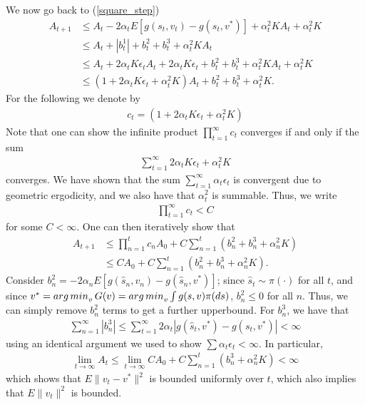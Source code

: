 \documentclass[twoside,11pt]{article}
\def\argmin{\mathop{\rm arg\, min}}
\begin{document}
We now go back to (\ref{square_step}) 
\begin{align*}
A_{t+1}&  \leq  A_t - 2\alpha_t E\left[ g(s_t,v_t) - g(s_t,v^*) \right] + \alpha_t^2 K A_t +  \alpha_t^2 K  \\
& \leq A_t + |b_t^1| + b_t^2 + b_t^3 +\alpha_t^2 K A_t\\
& \leq A_t + 2\alpha_t K \epsilon_t A_t + 2\alpha_t K \epsilon_t + b_t^2 + b_t^3 + \alpha_t^2 K A_t +  \alpha_t^2 K  \\
&\leq (1 + 2\alpha_t K \epsilon_t +   \alpha_t^2 K )A_t + b_t^2 + b_t^3  +  \alpha_t^2 K .
\end{align*}
For the following we denote by 
\begin{align*}
c_t =(1 + 2\alpha_t K \epsilon_t +   \alpha_t^2 K )
\end{align*}
Note that one can show the infinite product $\prod_{t=1}^\infty c_t$ converges if and only if the sum
\begin{align*}
\sum_{t=1}^\infty2\alpha_t K \epsilon_t +   \alpha_t^2 K 
\end{align*}
converges. We have shown that the sum  $\sum_{t=1}^\infty \alpha_t\epsilon_t$ is convergent due to geometric ergodicity, and we also have that $\alpha_t^2$ is summable. Thus, we write
\begin{align*}
\prod_{t=1}^\infty c_t < C
\end{align*}
for some $C<\infty$. One can then iteratively show that 
\begin{align*}
A_{t+1}& \leq \prod_{n=1}^{t} c_n A_0 + C \sum_{n=1}^t \left(b_n^2 + b_n^3   +  \alpha_n^2 K  \right)\\
& \leq C A_0 + C \sum_{n=1}^t \left(b_n^2 + b_n^3 + \alpha_n^2 K    \right).
\end{align*}
Consider $b^2_n=  - 2\alpha_n E\left[ g(\hat{s}_n,v_n) - g(\hat{s}_n,v^*) \right] $; since $\hat{s}_t\sim \pi(\cdot)$ for all $t$, and since $v^*=\argmin_v G(v) = \argmin_v \int g(s,v)\pi(ds)$, $b^2_n\leq 0$ for all $n$.    Thus, we can simply remove $b_n^2$ terms to get a further upperbound. For $b_n^3$, we have that 
\begin{align*}
\sum_{n=1}^\infty |b_n^3| \leq \sum_{t=1}^\infty 2\alpha_t \left|g(\hat{s}_t,v^*) - g(s_t,v^*)\right| <\infty 
\end{align*}
using an identical argument we used to show $\sum \alpha_t \epsilon_t < \infty$. 
       In particular,
\begin{align*}
\lim_{t\to \infty} A_t \leq \lim_{t\to \infty} C A_0 + C \sum_{n=1}^t   \left( b_n^3 + \alpha_n^2 K    \right) < \infty
\end{align*}
which shows that $E\|v_t-v^*\|^2$ is bounded uniformly over $t$, which also implies that $E\|v_t\|^2$ is bounded.
\end{document}
